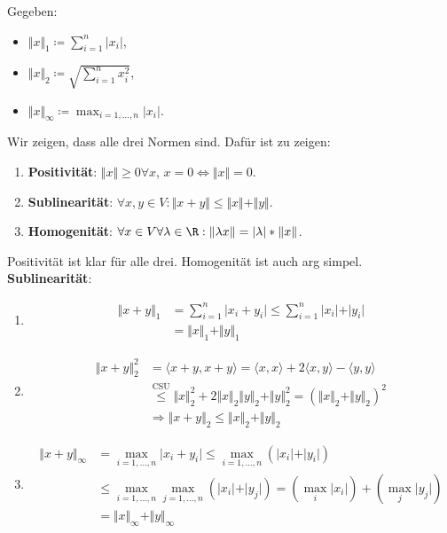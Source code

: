 \begin{problem*}[2]
  Gegeben:
  \begin{itemize}
    \item \( \Vert x \Vert_1 \coloneqq \sum_{i = 1}^n \vert x_i \vert \),
    \item \( \Vert x \Vert_2 \coloneqq \sqrt{\sum_{i=1}^n x_i^2} \),
    \item \( \Vert x \Vert_\infty \coloneqq \max_{i = 1,\dots,n} \vert x_i \vert \).
  \end{itemize}
  Wir zeigen, dass alle drei Normen sind. Dafür ist zu zeigen:
  \begin{enumerate}
    \item \textbf{Positivität}: \( \Vert x \Vert \geq 0 \forall x \), \( x = 0 \Leftrightarrow \Vert x \Vert = 0 \).
    \item \textbf{Sublinearität}: \( \forall x, y \in V: \Vert x + y \Vert \leq \Vert x \Vert + \Vert y \Vert \).
    \item \textbf{Homogenität}: \( \forall x \in V \forall \lambda \in \R: \Vert \lambda x \Vert = \vert \lambda \vert * \Vert x \Vert \).
  \end{enumerate}
  Positivität ist klar für alle drei. Homogenität ist auch arg simpel. \\
  \textbf{Sublinearität}:
  \begin{enumerate}
    \item \begin{align*}
      \Vert x + y \Vert_1 &= \sum_{i = 1}^n \vert x_i + y_i \vert \leq \sum_{i = 1}^n \vert x_i \vert + \vert y_i \vert \\
      &= \Vert x \Vert_1 + \Vert y \Vert_1
    \end{align*}
    \item \begin{align*}
      \Vert x + y \Vert^2_2 &= \langle x+y, x+y \rangle = \langle x, x \rangle + 2\langle x, y\rangle - \langle y, y \rangle \\
      &\overset{\text{CSU}}{\leq} \Vert x \Vert_2^2 + 2 \Vert x \Vert_2 \Vert y \Vert_2 + \Vert y \Vert_2^2 = {(\Vert x \Vert_2 + \Vert y \Vert_2)}^2 \\
      &\Rightarrow \Vert x +y \Vert_2 \leq \Vert x \Vert_2 + \Vert y \Vert_2
    \end{align*}
    \item \begin{align*}
      \Vert x + y \Vert_\infty &= \max_{i = 1, \dots,n} \vert x_i + y_i \vert \leq \max_{i = 1, \dots, n}(\vert x_i \vert + \vert y_i \vert) \\
      &\leq \max_{i = 1, \dots, n} \max_{j = 1, \dots, n}(\vert x_i \vert + \vert y_j \vert) = (\max_i \vert x_i \vert) + (\max_j \vert y_j \vert) \\
      &= \Vert x \Vert_\infty + \Vert y \Vert_\infty
    \end{align*}
  \end{enumerate}
\end{problem*}

